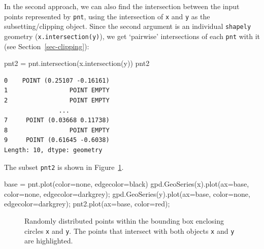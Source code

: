 \documentclass[
  letterpaper,
]{krantz}
\newenvironment{Shaded}{\begin{snugshade}}{\end{snugshade}}
\newcommand{\NormalTok}[1]{\textcolor[rgb]{0.00,0.23,0.31}{#1}}
\newcommand{\OperatorTok}[1]{\textcolor[rgb]{0.37,0.37,0.37}{#1}}
\newcommand{\StringTok}[1]{\textcolor[rgb]{0.13,0.47,0.30}{#1}}
\begin{document}
In the second approach, we can also find the intersection between the
input points represented by \texttt{pnt}, using the intersection of
\texttt{x} and \texttt{y} as the subsetting/clipping object. Since the
second argument is an individual \texttt{shapely} geometry
(\texttt{x.intersection(y)}), we get `pairwise' intersections of each
\texttt{pnt} with it (see Section~\ref{sec-clipping}):

\begin{Shaded}
\begin{Highlighting}[]
\NormalTok{pnt2 }\OperatorTok{=}\NormalTok{ pnt.intersection(x.intersection(y))}
\NormalTok{pnt2}
\end{Highlighting}
\end{Shaded}

\begin{verbatim}
0    POINT (0.25107 -0.16161)
1                 POINT EMPTY
2                 POINT EMPTY
               ...           
7     POINT (0.03668 0.11738)
8                 POINT EMPTY
9     POINT (0.61645 -0.6038)
Length: 10, dtype: geometry
\end{verbatim}

The subset \texttt{pnt2} is shown in
Figure~\ref{fig-intersection-points}.

\begin{Shaded}
\begin{Highlighting}[]
\NormalTok{base }\OperatorTok{=}\NormalTok{ pnt.plot(color}\OperatorTok{=}\StringTok{\textquotesingle{}none\textquotesingle{}}\NormalTok{, edgecolor}\OperatorTok{=}\StringTok{\textquotesingle{}black\textquotesingle{}}\NormalTok{)}
\NormalTok{gpd.GeoSeries(x).plot(ax}\OperatorTok{=}\NormalTok{base, color}\OperatorTok{=}\StringTok{\textquotesingle{}none\textquotesingle{}}\NormalTok{, edgecolor}\OperatorTok{=}\StringTok{\textquotesingle{}darkgrey\textquotesingle{}}\NormalTok{)}\OperatorTok{;}
\NormalTok{gpd.GeoSeries(y).plot(ax}\OperatorTok{=}\NormalTok{base, color}\OperatorTok{=}\StringTok{\textquotesingle{}none\textquotesingle{}}\NormalTok{, edgecolor}\OperatorTok{=}\StringTok{\textquotesingle{}darkgrey\textquotesingle{}}\NormalTok{)}\OperatorTok{;}
\NormalTok{pnt2.plot(ax}\OperatorTok{=}\NormalTok{base, color}\OperatorTok{=}\StringTok{\textquotesingle{}red\textquotesingle{}}\NormalTok{)}\OperatorTok{;}
\end{Highlighting}
\end{Shaded}

\begin{figure}[H]


\caption{\label{fig-intersection-points}Randomly distributed points
within the bounding box enclosing circles \texttt{x} and \texttt{y}. The
points that intersect with both objects \texttt{x} and \texttt{y} are
highlighted.}

\end{figure}%
\end{document}
